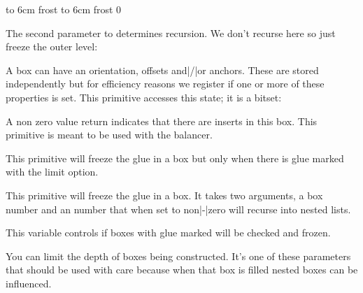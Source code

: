 \startbuffer
{} \hbox to 6cm {\hss frost}
 \hbox to 6cm {\hss frost}
 0
\stopbuffer

\typebuffer

The second parameter to  determines recursion. We don't recurse
here so just freeze the outer level:

\getbuffer

\stopnewprimitive

\startnewprimitive[title={\prm {boxgeometry}}]

A box can have an orientation, offsets and|/|or anchors. These are stored
independently but for efficiency reasons we register if one or more of these
properties is set. This primitive accesses this state; it is a bitset:


\stopnewprimitive

\startnewprimitive[title={\prm {boxinserts}}]

A non zero value return indicates that there are inserts in this box. This
primitive is meant to be used with the balancer.

\stopnewprimitive

\startnewprimitive[title={\prm {boxlimit}}]

This primitive will freeze the glue in a box but only when there is glue marked
with the limit option.

\stopnewprimitive

\startnewprimitive[title={\prm {boxlimitate}}]

This primitive will freeze the glue in a box. It takes two arguments, a box
number and an number that when set to non|-|zero will recurse into nested lists.

\stopnewprimitive

\startnewprimitive[title={\prm {boxlimitmode}}]

This variable controls if boxes with glue marked  will be checked
and frozen.

\stopnewprimitive

\startoldprimitive[title={\prm {boxmaxdepth}}]

You can limit the depth of boxes being constructed. It's one of these parameters
that should be used with care because when that box is filled nested boxes can be
influenced.

\stopoldprimitive

